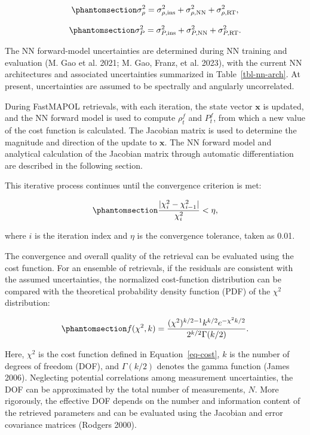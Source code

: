 \documentclass[
  11pt,
  letterpaper,
  DIV=11,
  numbers=noendperiod]{scrreprt}
\begin{document}
\begin{equation}\phantomsection\label{eq-sigma-rho}{
\sigma_\rho^2
=
\sigma_{\rho,\mathrm{ins}}^2
+
\sigma_{\rho,\mathrm{NN}}^2
+
\sigma_{\rho,\mathrm{RT}}^2,
}\end{equation}

\begin{equation}\phantomsection\label{eq-sigma-P}{
\sigma_P^2
=
\sigma_{P,\mathrm{ins}}^2
+
\sigma_{P,\mathrm{NN}}^2
+
\sigma_{P,\mathrm{RT}}^2.
}\end{equation}

The NN forward-model uncertainties are determined during NN training and
evaluation (M. Gao et al. 2021; M. Gao, Franz, et al. 2023), with the
current NN architectures and associated uncertainties summarized in
Table~\ref{tbl-nn-arch}. At present, uncertainties are assumed to be
spectrally and angularly uncorrelated.

During FastMAPOL retrievals, with each iteration, the state vector
\({\mathbf x}\) is updated, and the NN forward model is used to compute
\(\rho_t^f\) and \(P_t^f\), from which a new value of the cost function
is calculated. The Jacobian matrix is used to determine the magnitude
and direction of the update to \({\mathbf x}\). The NN forward model and
analytical calculation of the Jacobian matrix through automatic
differentiation are described in the following section.

This iterative process continues until the convergence criterion is met:

\begin{equation}\phantomsection\label{eq-delta-chi}{
\frac{|\chi_i^2-\chi_{i-1}^2|}
{\chi_i^2}
<
\eta,
}\end{equation}

where \(i\) is the iteration index and \(\eta\) is the convergence
tolerance, taken as 0.01.

The convergence and overall quality of the retrieval can be evaluated
using the cost function. For an ensemble of retrievals, if the residuals
are consistent with the assumed uncertainties, the normalized
cost-function distribution can be compared with the theoretical
probability density function (PDF) of the \(\chi^2\) distribution:

\begin{equation}\phantomsection\label{eq-chi2-pdf}{
f(\chi^2,k)
=
\frac{(\chi^2)^{k/2-1} k^{k/2} e^{-\chi^2 k/2}}
{2^{k/2}\Gamma(k/2)}.
}\end{equation}

Here, \(\chi^2\) is the cost function defined in Equation~\ref{eq-cost},
\(k\) is the number of degrees of freedom (DOF), and \(\Gamma(k/2)\)
denotes the gamma function (James 2006). Neglecting potential
correlations among measurement uncertainties, the DOF can be
approximated by the total number of measurements, \(N\). More
rigorously, the effective DOF depends on the number and information
content of the retrieved parameters and can be evaluated using the
Jacobian and error covariance matrices (Rodgers 2000).
\end{document}
